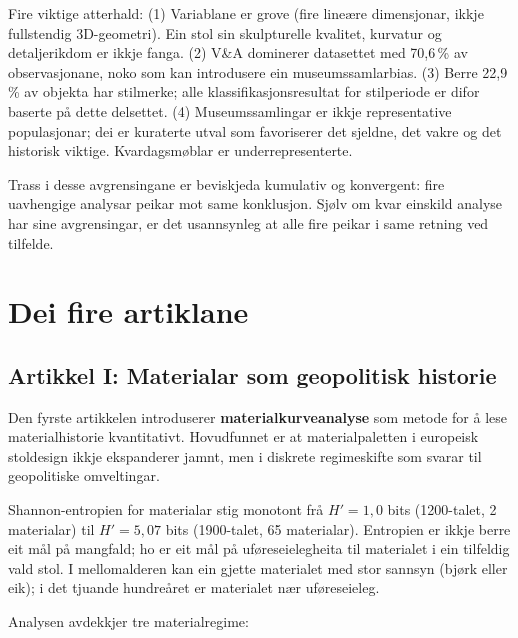 \documentclass[12pt, a4paper]{article}
\begin{document}
Fire viktige atterhald: (1) Variablane er grove (fire lineære dimensjonar, ikkje fullstendig 3D-geometri). Ein stol sin skulpturelle kvalitet, kurvatur og detaljerikdom er ikkje fanga. (2) V\&A dominerer datasettet med 70,6\,\% av observasjonane, noko som kan introdusere ein museumssamlarbias. (3) Berre 22,9\,\% av objekta har stilmerke; alle klassifikasjonsresultat for stilperiode er difor baserte på dette delsettet. (4) Museumssamlingar er ikkje representative populasjonar; dei er kuraterte utval som favoriserer det sjeldne, det vakre og det historisk viktige. Kvardagsmøblar er underrepresenterte.

Trass i desse avgrensingane er beviskjeda kumulativ og konvergent: fire uavhengige analysar peikar mot same konklusjon. Sjølv om kvar einskild analyse har sine avgrensingar, er det usannsynleg at alle fire peikar i same retning ved tilfelde.


\section{Dei fire artiklane}

\subsection{Artikkel I: Materialar som geopolitisk historie}

Den fyrste artikkelen introduserer \textbf{materialkurveanalyse} som metode for å lese materialhistorie kvantitativt. Hovudfunnet er at materialpaletten i europeisk stoldesign ikkje ekspanderer jamnt, men i diskrete regimeskifte som svarar til geopolitiske omveltingar.

Shannon-entropien for materialar stig monotont frå $H' = 1{,}0$ bits (1200-talet, 2 materialar) til $H' = 5{,}07$ bits (1900-talet, 65 materialar). Entropien er ikkje berre eit mål på mangfald; ho er eit mål på uføreseielegheita til materialet i ein tilfeldig vald stol. I mellomalderen kan ein gjette materialet med stor sannsyn (bjørk eller eik); i det tjuande hundreåret er materialet nær uføreseieleg.

Analysen avdekkjer tre materialregime:
\end{document}
